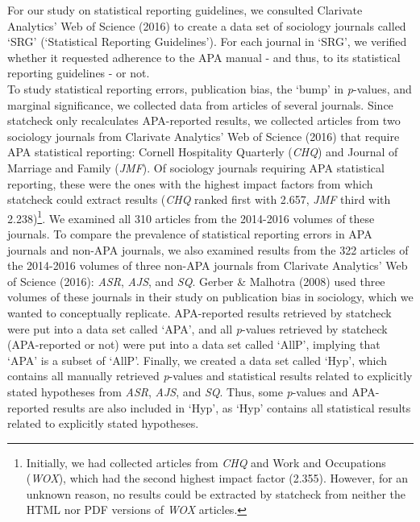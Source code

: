 \documentclass[
  12pt,
]{article}
\begin{document}
For our study on statistical reporting guidelines, we consulted
Clarivate Analytics' Web of Science (2016) to create a data set of
sociology journals called `SRG' (`Statistical Reporting Guidelines').
For each journal in `SRG', we verified whether it requested adherence to
the APA manual - and thus, to its statistical reporting guidelines - or
not.\\
\hspace*{0.333em}\hspace*{0.333em}\hspace*{0.333em}\hspace*{0.333em}To
study statistical reporting errors, publication bias, the `bump' in
\emph{p}-values, and marginal significance, we collected data from
articles of several journals. Since statcheck only recalculates
APA-reported results, we collected articles from two sociology journals
from Clarivate Analytics' Web of Science (2016) that require APA
statistical reporting: Cornell Hospitality Quarterly (\emph{CHQ}) and
Journal of Marriage and Family (\emph{JMF}). Of sociology journals
requiring APA statistical reporting, these were the ones with the
highest impact factors from which statcheck could extract results
(\emph{CHQ} ranked first with 2.657, \emph{JMF} third with
2.238)\footnote{Initially, we had collected articles from \emph{CHQ} and
  Work and Occupations (\emph{WOX}), which had the second highest impact
  factor (2.355). However, for an unknown reason, no results could be
  extracted by statcheck from neither the HTML nor PDF versions of
  \emph{WOX} articles.}. We examined all 310 articles from the 2014-2016
volumes of these journals. To compare the prevalence of statistical
reporting errors in APA journals and non-APA journals, we also examined
results from the 322 articles of the 2014-2016 volumes of three non-APA
journals from Clarivate Analytics' Web of Science (2016): \emph{ASR},
\emph{AJS}, and \emph{SQ}. Gerber \& Malhotra (2008) used three volumes
of these journals in their study on publication bias in sociology, which
we wanted to conceptually replicate. APA-reported results retrieved by
statcheck were put into a data set called `APA', and all \emph{p}-values
retrieved by statcheck (APA-reported or not) were put into a data set
called `AllP', implying that `APA' is a subset of `AllP'. Finally, we
created a data set called `Hyp', which contains all manually retrieved
\emph{p}-values and statistical results related to explicitly stated
hypotheses from \emph{ASR}, \emph{AJS}, and \emph{SQ}. Thus, some
\emph{p}-values and APA-reported results are also included in `Hyp', as
`Hyp' contains all statistical results related to explicitly stated
hypotheses.\\
\end{document}
